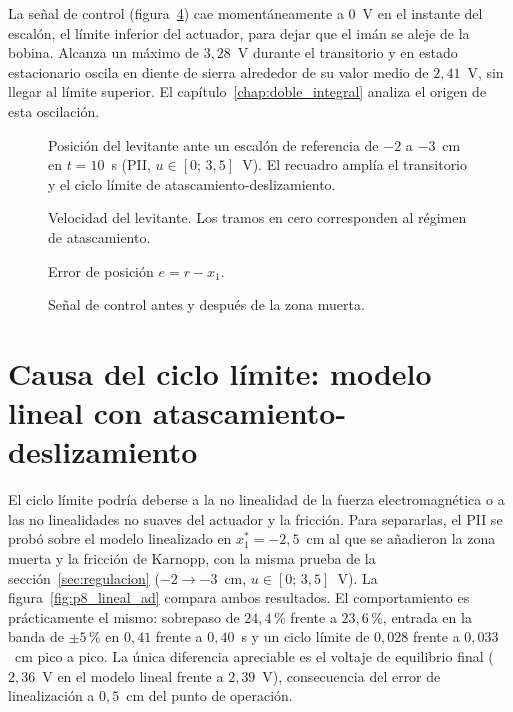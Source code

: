 La señal de control (figura~\ref{senal_control}) cae momentáneamente a 0~V en el instante del escalón, el límite inferior del actuador, para dejar que el imán se aleje de la bobina. Alcanza un máximo de $3{,}28$~V durante el transitorio y en estado estacionario oscila en diente de sierra alrededor de su valor medio de $2{,}41$~V, sin llegar al límite superior. El capítulo~\ref{chap:doble_integral} analiza el origen de esta oscilación.

\begin{figure}[ht]
    \centering
    
    \caption[Posición (regulación)]{Posición del levitante ante un escalón de referencia de $-2$ a $-3$~cm en $t=10$~s (PII, $u\in[0;\,3{,}5]$~V). El recuadro amplía el transitorio y el ciclo límite de atascamiento-deslizamiento.}
    \label{posicion}
\end{figure}

\begin{figure}[ht]
    \centering
    
    \caption[Velocidad (regulación)]{Velocidad del levitante. Los tramos en cero corresponden al régimen de atascamiento.}
    \label{velocidad}
\end{figure}

\begin{figure}[ht]
    \centering
    
    \caption[Error (regulación)]{Error de posición $e=r-x_1$.}
    \label{error}
\end{figure}

\begin{figure}[ht]
    \centering
    
    \caption[Señal de control (regulación)]{Señal de control antes y después de la zona muerta.}
    \label{senal_control}
\end{figure}

\FloatBarrier

\section{Causa del ciclo límite: modelo lineal con atascamiento-deslizamiento}
\label{sec:lineal_ad}

El ciclo límite podría deberse a la no linealidad de la fuerza electromagnética o a las no linealidades no suaves del actuador y la fricción. Para separarlas, el PII se probó sobre el modelo linealizado en $x_1^*=-2{,}5$~cm al que se añadieron la zona muerta y la fricción de Karnopp, con la misma prueba de la sección~\ref{sec:regulacion} ($-2\to-3$~cm, $u\in[0;\,3{,}5]$~V). La figura~\ref{fig:p8_lineal_ad} compara ambos resultados. El comportamiento es prácticamente el mismo: sobrepaso de $24{,}4$\,\% frente a $23{,}6$\,\%, entrada en la banda de $\pm5$\,\% en $0{,}41$ frente a $0{,}40$~s y un ciclo límite de $0{,}028$ frente a $0{,}033$~cm pico a pico. La única diferencia apreciable es el voltaje de equilibrio final ($2{,}36$~V en el modelo lineal frente a $2{,}39$~V), consecuencia del error de linealización a $0{,}5$~cm del punto de operación.

